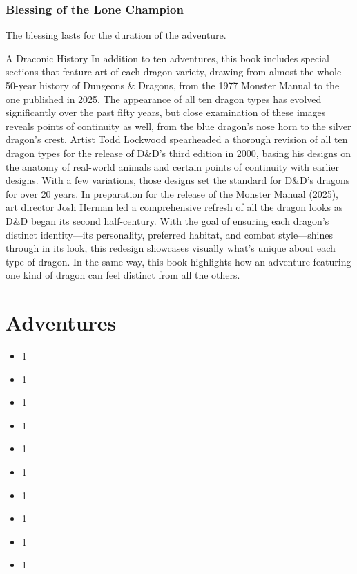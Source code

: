 \documentclass[letterpaper, 11pt, twocolumn]{dndbook}
\begin{document}
\subsubsection{Blessing of the Lone Champion}

The blessing lasts for the duration of the adventure.

\begin{DndSidebar}{A Draconic History}
In addition to ten adventures, this book includes special sections that feature art of each dragon variety, drawing from almost the whole 50-year history of Dungeons \& Dragons, from the 1977 Monster Manual to the one published in 2025. The appearance of all ten dragon types has evolved significantly over the past fifty years, but close examination of these images reveals points of continuity as well, from the blue dragon's nose horn to the silver dragon's crest.
Artist Todd Lockwood spearheaded a thorough revision of all ten dragon types for the release of D\&D's third edition in 2000, basing his designs on the anatomy of real-world animals and certain points of continuity with earlier designs. With a few variations, those designs set the standard for D\&D's dragons for over 20 years.
In preparation for the release of the Monster Manual (2025), art director Josh Herman led a comprehensive refresh of all the dragon looks as D\&D began its second half-century. With the goal of ensuring each dragon's distinct identity---its personality, preferred habitat, and combat style---shines through in its look, this redesign showcases visually what's unique about each type of dragon.
In the same way, this book highlights how an adventure featuring one kind of dragon can feel distinct from all the others.
\end{DndSidebar}
\section{Adventures}

\begin{itemize}
\item 1
\item 1
\item 1
\item 1
\item 1
\item 1
\item 1
\item 1
\item 1
\item 1
\end{itemize}
\end{document}
